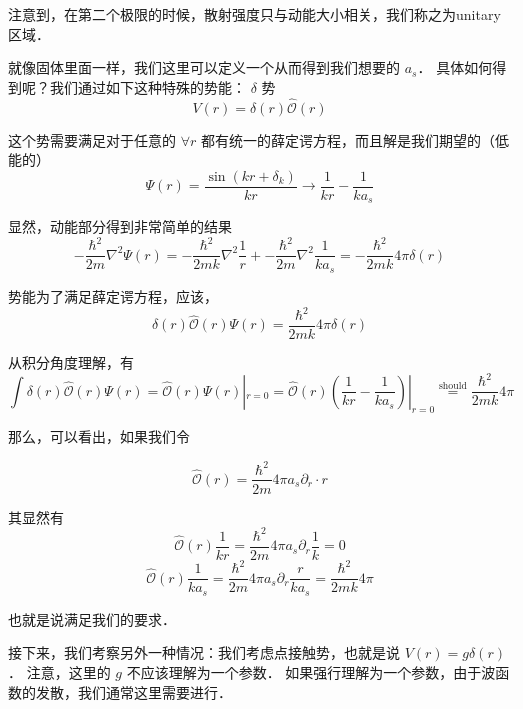 注意到，在第二个极限的时候，散射强度只与动能大小相关，我们称之为unitary区域．

就像固体里面一样，我们这里可以定义一个从而得到我们想要的 $a_s$． 具体如何得到呢？我们通过如下这种特殊的势能： $\delta$ 势
\begin{equation}
V(r) = \delta(r)\hat{\mathcal{O}}(r)
\end{equation}

这个势需要满足对于任意的 $\forall r$ 都有统一的薛定谔方程，而且解是我们期望的（低能的）
\begin{equation}
\Psi(r) = \frac{\sin(kr+\delta_k)}{kr}\to \frac{1}{kr} - \frac{1}{ka_s}
\end{equation}

显然，动能部分得到非常简单的结果
\begin{equation}
-\frac{\hbar^2}{2m}\nabla^2\Psi(r) = -\frac{\hbar^2}{2mk}\nabla^2 \frac{1}{r} + -\frac{\hbar^2}{2m}\nabla^2\frac{1}{ka_s} = -\frac{\hbar^2}{2mk}4\pi\delta(r)
\end{equation}

势能为了满足薛定谔方程，应该，
\begin{equation}
\delta(r)\hat{\mathcal{O}}(r)\Psi(r) = \frac{\hbar^2}{2mk}4\pi\delta(r)
\end{equation}

从积分角度理解，有
\begin{equation}
\int\delta(r)\hat{\mathcal{O}}(r)\Psi(r) = \hat{\mathcal{O}}(r)\Psi(r)|_{r=0} =  \hat{\mathcal{O}}(r)\left(\frac{1}{kr} - \frac{1}{ka_s}\right)|_{r=0} \overset{\text{should}}{=} \frac{\hbar^2}{2mk}4\pi
\end{equation}

那么，可以看出，如果我们令

\begin{equation}
\hat{\mathcal{O}}(r) = \frac{\hbar^2}{2m}4\pi a_s \partial_r\cdot r
\end{equation}

其显然有
\begin{equation}
\hat{\mathcal{O}}(r)\frac{1}{kr} = \frac{\hbar^2}{2m}4\pi a_s \partial_r \frac{1}{k} = 0
\end{equation}
\begin{equation}
\hat{\mathcal{O}}(r)\frac{1}{ka_s} = \frac{\hbar^2}{2m}4\pi a_s \partial_r \frac{r}{ka_s} = \frac{\hbar^2}{2mk}4\pi
\end{equation}

也就是说满足我们的要求．

接下来，我们考察另外一种情况：我们考虑点接触势，也就是说 $V(r) = g\delta(r)$． 注意，这里的 $g$ 不应该理解为一个参数． 如果强行理解为一个参数，由于波函数的发散，我们通常这里需要进行．


